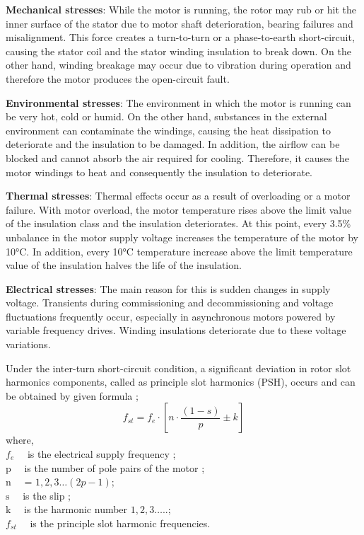 \textbf{Mechanical stresses}: While the motor is running, the rotor may rub or hit the inner surface of the stator due to motor shaft deterioration, bearing failures and misalignment. This force creates a turn-to-turn or a phase-to-earth short-circuit, causing the stator coil and the stator winding insulation to break down. On the other hand, winding breakage may occur due to vibration during operation and therefore the motor produces the open-circuit fault.

\textbf{Environmental stresses}: The environment in which the motor is running can be very hot, cold or humid. On the other hand, substances in the external environment can contaminate the windings, causing the heat dissipation to deteriorate and the insulation to be damaged. In addition, the airflow can be blocked and cannot absorb the air required for cooling. Therefore, it causes the motor windings to heat and consequently the insulation to deteriorate.

\textbf{Thermal stresses}: Thermal effects occur as a result of overloading or a motor failure. With motor overload, the motor temperature rises above the limit value of the insulation class and the insulation deteriorates. At this point, every 3.5\% unbalance in the motor supply voltage increases the temperature of the motor by 10°C. In addition, every 10°C temperature increase above the limit temperature value of the insulation halves the life of the insulation.

\textbf{Electrical stresses}: The main reason for this is sudden changes in supply voltage. Transients during commissioning and decommissioning and voltage fluctuations frequently occur, especially in asynchronous motors powered by variable frequency drives. Winding insulations deteriorate due to these voltage variations.

Under the inter-turn short-circuit condition, a significant deviation in rotor slot harmonics components, called as principle slot harmonics (PSH), occurs and can be obtained by given formula \cite{Penman};
\begin{equation}
	f_{st}=f_{e} \cdot\left[n \cdot \frac{(1-s)}{p} \pm k\right]
	\label{statorfault}
\end{equation}
where,\\
$f_{e} \quad$ is the electrical supply frequency ;\\
$\mathrm{p} \quad$ is the number of pole pairs of the motor ;\\
$\mathrm{n} \quad$ = $1,2,3 \ldots (2p-1)$;\\
$\mathrm{s} \quad$ is the slip ;\\
$\mathrm{k} \quad$ is the harmonic number $1,2,3 \ldots$..;\\
$f_{st} \quad$ is the principle slot harmonic frequencies.


